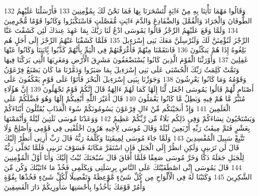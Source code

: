 \documentclass[20pt,a4paper]{article}
\begin{document}
{\tiny\colorbox{cl_aya}{132}} وَقَالُوا مَهْمَا تَأْتِنَا بِهِ مِنْ ءَايَةٍ لِّتَسْحَرَنَا بِهَا فَمَا نَحْنُ لَكَ بِمُؤْمِنِينَ
{\tiny\colorbox{cl_aya}{133}} فَأَرْسَلْنَا عَلَيْهِمُ الطُّوفَانَ وَالْجَرَادَ وَالْقُمَّلَ وَالضَّفَادِعَ وَالدَّمَ ءَايَتٍ مُّفَصَّلَتٍ فَاسْتَكْبَرُوا وَكَانُوا قَوْمًا مُّجْرِمِينَ
{\tiny\colorbox{cl_aya}{134}} وَلَمَّا وَقَعَ عَلَيْهِمُ الرِّجْزُ قَالُوا يَمُوسَى ادْعُ لَنَا رَبَّكَ بِمَا عَهِدَ عِندَكَ لَئِن كَشَفْتَ عَنَّا الرِّجْزَ لَنُؤْمِنَنَّ لَكَ وَلَنُرْسِلَنَّ مَعَكَ بَنِى إِسْرَءِيلَ
{\tiny\colorbox{cl_aya}{135}} فَلَمَّا كَشَفْنَا عَنْهُمُ الرِّجْزَ إِلَى أَجَلٍ هُم بَلِغُوهُ إِذَا هُمْ يَنكُثُونَ
{\tiny\colorbox{cl_aya}{136}} فَانتَقَمْنَا مِنْهُمْ فَأَغْرَقْنَهُمْ فِى الْيَمِّ بِأَنَّهُمْ كَذَّبُوا بَِٔايَتِنَا وَكَانُوا عَنْهَا غَفِلِينَ
{\tiny\colorbox{cl_aya}{137}} وَأَوْرَثْنَا الْقَوْمَ الَّذِينَ كَانُوا يُسْتَضْعَفُونَ مَشَرِقَ الْأَرْضِ وَمَغَرِبَهَا الَّتِى بَرَكْنَا فِيهَا وَتَمَّتْ كَلِمَتُ رَبِّكَ الْحُسْنَى عَلَى بَنِى إِسْرَءِيلَ بِمَا صَبَرُوا وَدَمَّرْنَا مَا كَانَ يَصْنَعُ فِرْعَوْنُ وَقَوْمُهُ وَمَا كَانُوا يَعْرِشُونَ
{\tiny\colorbox{cl_aya}{138}} وَجَوَزْنَا بِبَنِى إِسْرَءِيلَ الْبَحْرَ فَأَتَوْا عَلَى قَوْمٍ يَعْكُفُونَ عَلَى أَصْنَامٍ لَّهُمْ قَالُوا يَمُوسَى اجْعَل لَّنَا إِلَهًا كَمَا لَهُمْ ءَالِهَةٌ قَالَ إِنَّكُمْ قَوْمٌ تَجْهَلُونَ
{\tiny\colorbox{cl_aya}{139}} إِنَّ هَؤُلَاءِ مُتَبَّرٌ مَّا هُمْ فِيهِ وَبَطِلٌ مَّا كَانُوا يَعْمَلُونَ
{\tiny\colorbox{cl_aya}{140}} قَالَ أَغَيْرَ اللَّهِ أَبْغِيكُمْ إِلَهًا وَهُوَ فَضَّلَكُمْ عَلَى الْعَلَمِينَ
{\tiny\colorbox{cl_aya}{141}} وَإِذْ أَنجَيْنَكُم مِّنْ ءَالِ فِرْعَوْنَ يَسُومُونَكُمْ سُوءَ الْعَذَابِ يُقَتِّلُونَ أَبْنَاءَكُمْ وَيَسْتَحْيُونَ نِسَاءَكُمْ وَفِى ذَلِكُم بَلَاءٌ مِّن رَّبِّكُمْ عَظِيمٌ
{\tiny\colorbox{cl_aya}{142}} وَوَعَدْنَا مُوسَى ثَلَثِينَ لَيْلَةً وَأَتْمَمْنَهَا بِعَشْرٍ فَتَمَّ مِيقَتُ رَبِّهِ أَرْبَعِينَ لَيْلَةً وَقَالَ مُوسَى لِأَخِيهِ هَرُونَ اخْلُفْنِى فِى قَوْمِى وَأَصْلِحْ وَلَا تَتَّبِعْ سَبِيلَ الْمُفْسِدِينَ
{\tiny\colorbox{cl_aya}{143}} وَلَمَّا جَاءَ مُوسَى لِمِيقَتِنَا وَكَلَّمَهُ رَبُّهُ قَالَ رَبِّ أَرِنِى أَنظُرْ إِلَيْكَ قَالَ لَن تَرَىنِى وَلَكِنِ انظُرْ إِلَى الْجَبَلِ فَإِنِ اسْتَقَرَّ مَكَانَهُ فَسَوْفَ تَرَىنِى فَلَمَّا تَجَلَّى رَبُّهُ لِلْجَبَلِ جَعَلَهُ دَكًّا وَخَرَّ مُوسَى صَعِقًا فَلَمَّا أَفَاقَ قَالَ سُبْحَنَكَ تُبْتُ إِلَيْكَ وَأَنَا أَوَّلُ الْمُؤْمِنِينَ
{\tiny\colorbox{cl_aya}{144}} قَالَ يَمُوسَى إِنِّى اصْطَفَيْتُكَ عَلَى النَّاسِ بِرِسَلَتِى وَبِكَلَمِى فَخُذْ مَا ءَاتَيْتُكَ وَكُن مِّنَ الشَّكِرِينَ
{\tiny\colorbox{cl_aya}{145}} وَكَتَبْنَا لَهُ فِى الْأَلْوَاحِ مِن كُلِّ شَىْءٍ مَّوْعِظَةً وَتَفْصِيلًا لِّكُلِّ شَىْءٍ فَخُذْهَا بِقُوَّةٍ وَأْمُرْ قَوْمَكَ يَأْخُذُوا بِأَحْسَنِهَا سَأُورِيكُمْ دَارَ الْفَسِقِينَ
\end{document}
